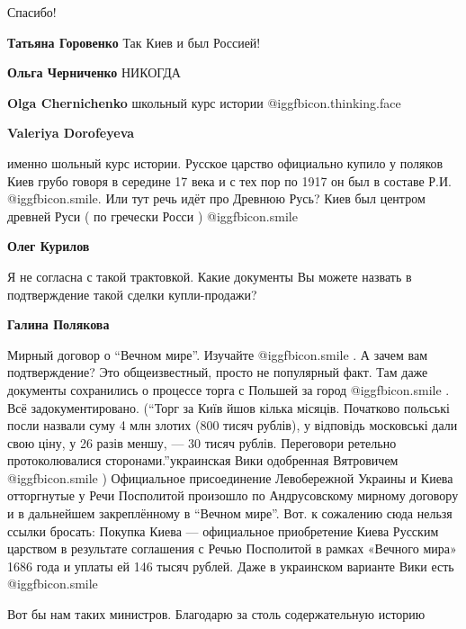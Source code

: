 \begin{itemize}
Спасибо!

\textbf{Татьяна Горовенко} Так Киев и был Россией!

\begin{itemize} %
\textbf{Ольга Черниченко} НИКОГДА

\textbf{Olga Chernichenko} школьный курс истории @igg{fbicon.thinking.face} 

\begin{itemize} %
\textbf{Valeriya Dorofeyeva} 

именно шольный курс истории. Русское царство официально купило у поляков Киев
грубо говоря в середине 17 века и с тех пор по 1917 он был в составе Р.И.
@igg{fbicon.smile}.  Или тут речь идёт про Древнюю Русь? Киев был центром
древней Руси ( по гречески Росси )  @igg{fbicon.smile} 


\textbf{Олег Курилов} 

Я не согласна с такой трактовкой. Какие документы Вы можете назвать в
подтверждение такой сделки купли-продажи?

\textbf{Галина Полякова} 

Мирный договор о \enquote{Вечном мире}. Изучайте  @igg{fbicon.smile} . А зачем вам подтверждение? Это
общеизвестный, просто не популярный факт. Там даже документы сохранились о
процессе торга с Польшей за город  @igg{fbicon.smile} . Всё задокументировано. (\enquote{Торг за Київ
йшов кілька місяців. Початково польські посли назвали суму 4 млн злотих (800
тисяч рублів), у відповідь московські дали свою ціну, у 26 разів меншу, — 30
тисяч рублів. Переговори ретельно протоколювалися сторонами.}украинская Вики
одобренная Вятровичем  @igg{fbicon.smile}  ) Официальное присоединение Левобережной Украины и
Киева отторгнутые у Речи Посполитой произошло по Андрусовскому мирному договору
и в дальнейшем закреплённому в \enquote{Вечном мире}. Вот. к сожалению сюда нельзя
ссылки бросать: Покупка Киева — официальное приобретение Киева Русским царством
в результате соглашения с Речью Посполитой в рамках «Вечного мира» 1686 года и
уплаты ей 146 тысяч рублей. Даже в украинском варианте Вики есть  @igg{fbicon.smile} 

\end{itemize} %

\end{itemize} %

Вот бы нам таких министров. Благодарю за столь содержательную историю


\end{itemize}
